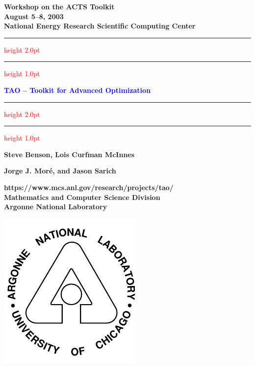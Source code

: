 \documentclass{seminar}
\newcommand{\redstripe}{\textcolor{red}{\hrule height 2.0pt\hfil}
             \vspace{-1.8pt}
             \textcolor{red}{\hrule height 1.0pt\hfil}
}
\begin{document}
\begin{slide}

\begin{center}
{\bf
Workshop on the ACTS Toolkit \\
August 5--8, 2003 \\
National Energy Research Scientific Computing Center
}
\end{center}

\redstripe

\begin{center}
{\bf
\textcolor{blue}{TAO -- Toolkit for Advanced Optimization}
}

\redstripe

\medskip

\centerline{\bf Steve Benson, Lois Curfman McInnes} 
\centerline{\bf Jorge J. Mor\'e, and Jason Sarich}

\end{center}


\parbox[b]{3in}{\bf https://www.mcs.anl.gov/research/projects/tao/ \bigskip \\
\small  Mathematics and Computer Science Division \\ 
Argonne National Laboratory} \includegraphics[scale=0.5]{../images//argonne}

\end{slide}
\end{document}
